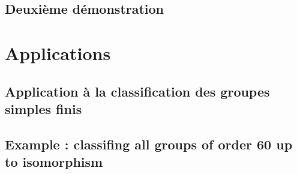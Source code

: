 \documentclass[french]{article}
\theoremstyle{definition}
\theoremstyle{plain}
\theoremstyle{plain}
\theoremstyle{plain}
\theoremstyle{plain}
\theoremstyle{plain}
\begin{document}
\subsection{Deuxième démonstration}


\clearpage
\section{Applications}
\subsection{Application à la classification des groupes simples finis}

\cite{dummit2003abstract}

\subsection{Example : classifing all groups of order 60 up to isomorphism}


\clearpage

\printbibliography
\end{document}

